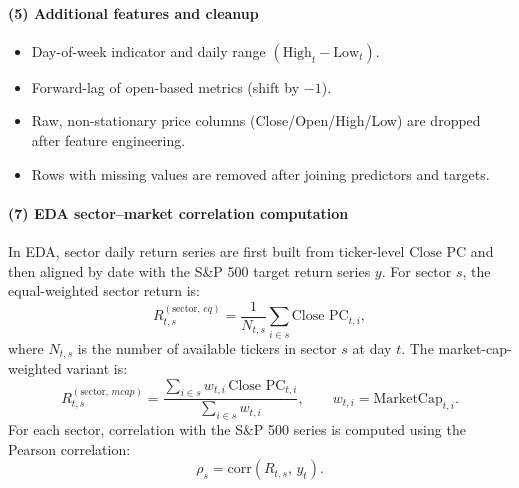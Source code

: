 \documentclass[11pt]{article}
\begin{document}
\paragraph{(5) Additional features and cleanup}
\begin{itemize}
  \item Day-of-week indicator and daily range \((\text{High}_t-\text{Low}_t)\).
  \item Forward-lag of open-based metrics (shift by \(-1\)).
  \item Raw, non-stationary price columns (Close/Open/High/Low) are dropped after feature engineering.
  \item Rows with missing values are removed after joining predictors and targets.
\end{itemize}

\paragraph{(7) EDA sector--market correlation computation}
In EDA, sector daily return series are first built from ticker-level \(\text{Close PC}\) and then aligned by date with the S\&P 500 target return series \(y\). For sector \(s\), the equal-weighted sector return is:
\[
R^{(\text{sector},\,eq)}_{t,s}=\frac{1}{N_{t,s}}\sum_{i\in s}\text{Close PC}_{t,i},
\]
where \(N_{t,s}\) is the number of available tickers in sector \(s\) at day \(t\). The market-cap-weighted variant is:
\[
R^{(\text{sector},\,mcap)}_{t,s}=\frac{\sum_{i\in s}w_{t,i}\,\text{Close PC}_{t,i}}
{\sum_{i\in s}w_{t,i}},\qquad w_{t,i}=\text{MarketCap}_{t,i}.
\]
For each sector, correlation with the S\&P 500 series is computed using the Pearson correlation:
\[
\rho_s=\mathrm{corr}\!\left(R_{t,s},\,y_t\right).
\]
\end{document}
